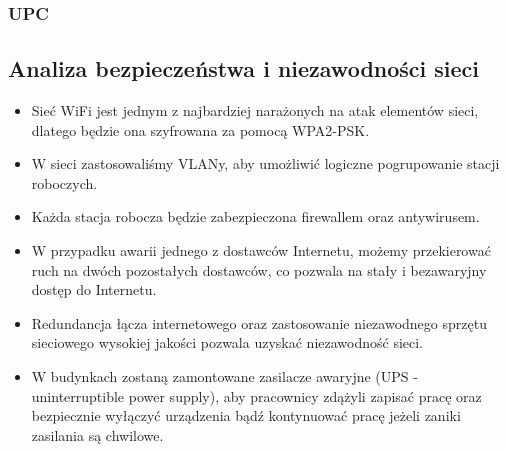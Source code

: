 \documentclass[a4paper,12pt]{extarticle}  %
\begin{document}
\subsubsection{UPC}
\begin{figure}[H]
	\centering
\end{figure}
\subsection{Analiza bezpieczeństwa i niezawodności sieci}
\begin{itemize}
	\item Sieć WiFi jest jednym z najbardziej narażonych na atak elementów sieci, dlatego będzie ona szyfrowana za pomocą WPA2-PSK.
	\item W sieci zastosowaliśmy VLANy, aby umożliwić logiczne pogrupowanie stacji roboczych.
	\item Każda stacja robocza będzie zabezpieczona firewallem oraz antywirusem.
	\item W przypadku awarii jednego z dostawców Internetu, możemy przekierować ruch na dwóch pozostałych dostawców, co pozwala na stały i bezawaryjny dostęp do Internetu.
	\item Redundancja łącza internetowego oraz zastosowanie niezawodnego sprzętu sieciowego wysokiej jakości pozwala uzyskać niezawodność sieci.
	\item W budynkach zostaną zamontowane zasilacze awaryjne (UPS - uninterruptible power supply), aby pracownicy zdążyli zapisać pracę oraz bezpiecznie wyłączyć
	      urządzenia bądź kontynuować pracę jeżeli zaniki zasilania są chwilowe.
\end{itemize}
\end{document}
